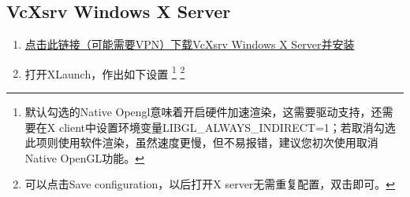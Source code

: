 \documentclass[UTF8,zhmap=true,fontset=none,zihao=-4,heading=false,scheme=chinese]{ctexart}
\begin{document}
\subsection{VcXsrv Windows X Server}
\begin{enumerate}
    \item \href{https://desktop.docker.com/win/main/amd64/Docker%20Desktop%20Installer.exe?utm_source=docker&utm_medium=webreferral&utm_campaign=dd-smartbutton&utm_location=module}{点击此链接（可能需要VPN）下载VcXsrv Windows X Server并安装}
    \item 打开XLaunch，作出如下设置
\footnote{默认勾选的Native Opengl意味着开启硬件加速渲染，这需要驱动支持，还需要在X client中设置环境变量LIBGL\_ALWAYS\_INDIRECT=1；若取消勾选此项则使用软件渲染，虽然速度更慢，但不易报错，建议您初次使用取消Native OpenGL功能。}
\footnote{可以点击Save configuration，以后打开X server无需重复配置，双击即可。}
\end{enumerate}
\end{document}
